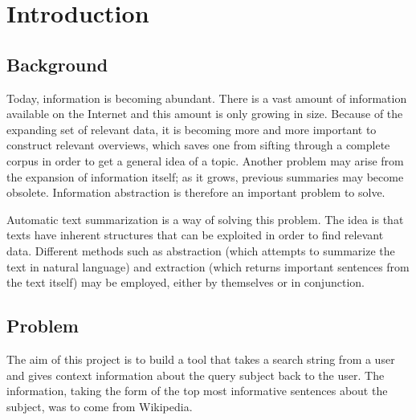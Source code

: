 

\chapter{Introduction}
\section{Background}
Today, information is becoming abundant. There is a vast amount of information available on the Internet and this amount is only growing in size. Because of the expanding set of relevant data, it is becoming more and more important to construct relevant overviews, which saves one from sifting through a complete corpus in order to get a general idea of a topic. Another problem may arise from the expansion of information itself; as it grows, previous summaries may become obsolete. Information abstraction is therefore an important problem to solve.

Automatic text summarization is a way of solving this problem. The idea is that texts have inherent structures that can be exploited in order to find relevant data. Different methods such as abstraction (which attempts to summarize the text in natural language) and extraction (which returns important sentences from the text itself) may be employed, either by themselves or in conjunction.

\section{Problem}
The aim of this project is to build a tool that takes a search string from a user and gives context information about the query subject back to the user. The information, taking the form of the top most informative sentences about the subject, was to come from Wikipedia. 